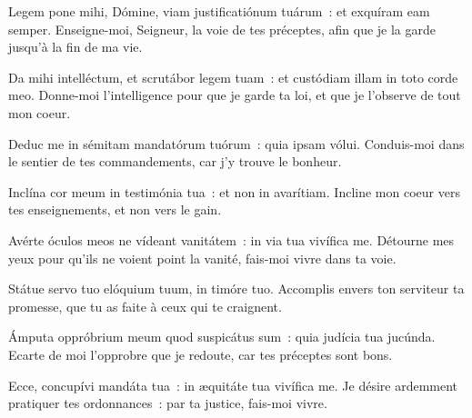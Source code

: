 
\begin{paracol}{2}

\LigneParacol{0cm}
{Legem pone mihi, Dómine, viam justificatiónum tuárum~: \GreStar{} et exquíram eam semper.}
{Enseigne-moi, Seigneur, la voie de tes préceptes, afin que je la garde jusqu'à la fin de ma vie.}

\LigneParacol{0.2cm}
{Da mihi intelléctum, et scrutábor legem tuam~: \GreStar{} et custódiam illam in toto corde meo.}
{Donne-moi l'intelligence pour que je garde ta loi, et que je l'observe de tout mon coeur.}

\LigneParacol{0.2cm}
{Deduc me in sémitam mandatórum tuórum~: \GreStar{} quia ipsam vólui.}
{Conduis-moi dans le sentier de tes commandements, car j'y trouve le bonheur.}

\LigneParacol{0.2cm}
{Inclína cor meum in testimónia tua~: \GreStar{} et non in avarítiam.}
{Incline mon coeur vers tes enseignements, et non vers le gain.}

\LigneParacol{0.2cm}
{Avérte óculos meos ne vídeant vanitátem~: \GreStar{} in via tua vivífica me.}
{Détourne mes yeux pour qu'ils ne voient point la vanité, fais-moi vivre dans ta voie.}

\LigneParacol{0.2cm}
{Státue servo tuo elóquium tuum, \GreStar{} in timóre tuo.}
{Accomplis envers ton serviteur ta promesse, que tu as faite à ceux qui te craignent.}

\LigneParacol{0.2cm}
{Ámputa oppróbrium meum quod suspicátus sum~: \GreStar{} quia judícia tua jucúnda.}
{Ecarte de moi l'opprobre que je redoute, car tes préceptes sont bons.}

\LigneParacol{0.2cm}
{Ecce, concupívi mandáta tua~: \GreStar{} in æquitáte tua vivífica me.}
{Je désire ardemment pratiquer tes ordonnances~: par ta justice, fais-moi vivre. }

\end{paracol}
\Gloria
